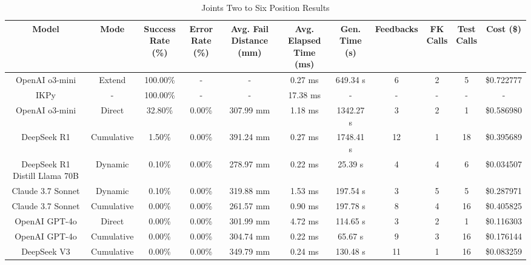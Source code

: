 \begin{landscape}
\begin{table}[H]
\tiny
\renewcommand{\arraystretch}{1.2}
\caption{Joints Two to Six Position Results}
\begin{center}
\begin{tabular}{|c|c|c|c|c|c|c|c|c|c|c|}
    \hline
    \textbf{Model} & 
    \textbf{Mode} & 
    \makecell{\textbf{Success}\\\textbf{Rate (\%)}} &
    \makecell{\textbf{Error}\\\textbf{Rate (\%)}} &
    \makecell{\textbf{Avg. Fail}\\\textbf{Distance (mm)}} &
    \makecell{\textbf{Avg. Elapsed}\\\textbf{Time (ms)}} &
    \makecell{\textbf{Gen.}\\\textbf{Time (s)}} &
    \textbf{Feedbacks} &
    \makecell{\textbf{FK}\\\textbf{Calls}} &
    \makecell{\textbf{Test}\\\textbf{Calls}} &
    \textbf{Cost (\$)} \\
    \hline
    OpenAI o3-mini & Extend & 100.00\% & - & - & 0.27 ms & 649.34 s & 6 & 2 & 5 & \$0.722777 \\
    \hline
    IKPy & - & 100.00\% & - & - & 17.38 ms & - & - & - & - & - \\
    \hline
    OpenAI o3-mini & Direct & 32.80\% & 0.00\% & 307.99 mm & 1.18 ms & 1342.27 s & 3 & 2 & 1 & \$0.586980 \\
    \hline
    DeepSeek R1 & Cumulative & 1.50\% & 0.00\% & 391.24 mm & 0.27 ms & 1748.41 s & 12 & 1 & 18 & \$0.395689 \\
    \hline
    DeepSeek R1 Distill Llama 70B & Dynamic & 0.10\% & 0.00\% & 278.97 mm & 0.22 ms & 25.39 s & 4 & 4 & 6 & \$0.034507 \\
    \hline
    Claude 3.7 Sonnet & Dynamic & 0.10\% & 0.00\% & 319.88 mm & 1.53 ms & 197.54 s & 3 & 5 & 5 & \$0.287971 \\
    \hline
    Claude 3.7 Sonnet & Cumulative & 0.00\% & 0.00\% & 261.57 mm & 0.90 ms & 197.78 s & 8 & 4 & 16 & \$0.405825 \\
    \hline
    OpenAI GPT-4o & Direct & 0.00\% & 0.00\% & 301.99 mm & 4.72 ms & 114.65 s & 3 & 2 & 1 & \$0.116303 \\
    \hline
    OpenAI GPT-4o & Cumulative & 0.00\% & 0.00\% & 304.74 mm & 0.22 ms & 65.67 s & 9 & 3 & 16 & \$0.176144 \\
    \hline
    DeepSeek V3 & Cumulative & 0.00\% & 0.00\% & 349.79 mm & 0.24 ms & 130.48 s & 11 & 1 & 16 & \$0.083259 \\

\end{tabular}
\end{center}
\end{table}
\end{landscape}
